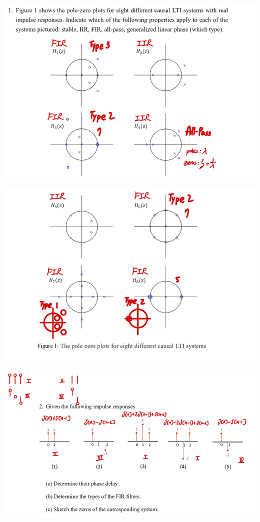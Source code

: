 \documentclass[a4paper]{article}
\begin{document}
\newpage

	\begin{center}
		\includegraphics[width=1\linewidth]{screenshot123}
	\end{center}
	\begin{center}
		\includegraphics[width=1\linewidth]{screenshot124}
	\end{center}
	\begin{center}
		\includegraphics[width=1\linewidth]{screenshot125}
	\end{center}
\end{document}
